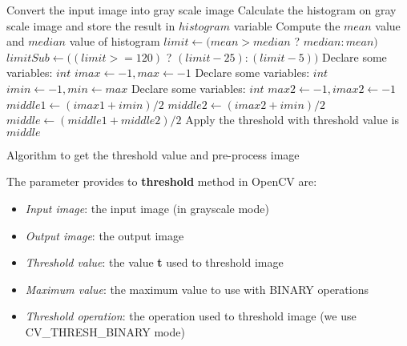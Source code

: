 \begin{algorithm}[H]
\SetAlgoLined
\Indm 
{}
\Indp
Convert the input image into gray scale image\;
Calculate the histogram on gray scale image and store the result in $histogram$ variable \;
Compute the $mean$ value and $median$ value of histogram\;
$limit \leftarrow (mean > median$ ? $median : mean)$\;
$limitSub \leftarrow ((limit >= 120)$ ? $(limit - 25) : (limit - 5))$\;
Declare some variables: $int$ $imax \leftarrow -1, max \leftarrow -1$\;
Declare some variables: $int$ $imin \leftarrow -1, min \leftarrow max$\;
Declare some variables: $int$ $max2 \leftarrow -1, imax2 \leftarrow -1$\;
$middle1 \leftarrow (imax1 + imin)/2$ \;
$middle2 \leftarrow (imax2 + imin)/2$ \;
$middle \leftarrow (middle1 + middle2)/2$ \;
Apply the threshold with threshold value is $middle$\;
\caption{Algorithm to get the threshold value and pre-process image}
\label{al_preprocess}
\end{algorithm}\DecMargin{1em}
The parameter provides to \textbf{threshold} method in OpenCV are:
\begin{itemize}
\item \textit{Input image}: the input image (in grayscale mode)
\item \textit{Output image}: the output image
\item \textit{Threshold value}: the value \textbf{t} used to threshold image
\item \textit{Maximum value}: the maximum value to use with BINARY operations
\item \textit{Threshold operation}: the operation used to threshold image (we use CV\_THRESH\_BINARY mode)
\end{itemize}

